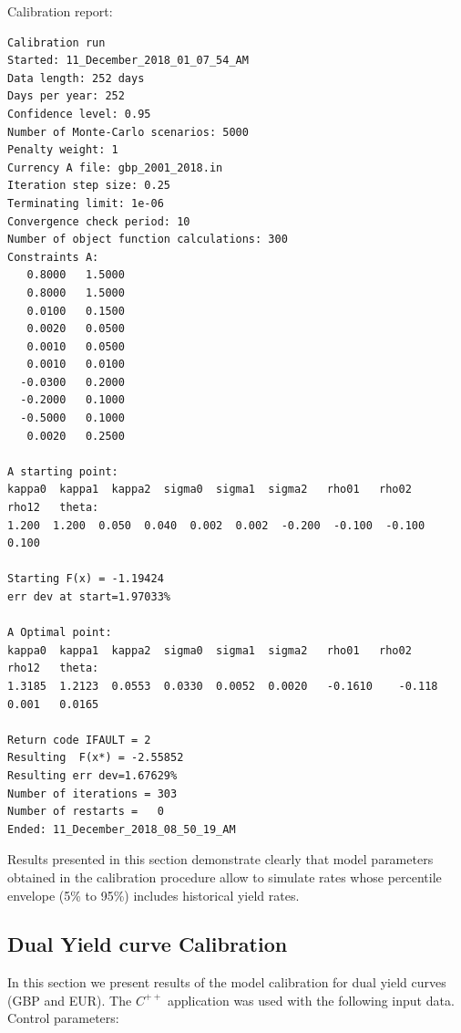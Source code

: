 \documentclass[10pt]{article}
\begin{document}
\begin{tcolorbox}

Calibration report:

\begin{verbatim}
Calibration run
Started: 11_December_2018_01_07_54_AM
Data length: 252 days
Days per year: 252
Confidence level: 0.95
Number of Monte-Carlo scenarios: 5000
Penalty weight: 1
Currency A file: gbp_2001_2018.in
Iteration step size: 0.25
Terminating limit: 1e-06
Convergence check period: 10
Number of object function calculations: 300
Constraints A:
   0.8000   1.5000
   0.8000   1.5000
   0.0100   0.1500
   0.0020   0.0500
   0.0010   0.0500
   0.0010   0.0100
  -0.0300   0.2000
  -0.2000   0.1000
  -0.5000   0.1000
   0.0020   0.2500

A starting point:
kappa0	kappa1	kappa2	sigma0	sigma1	sigma2   rho01	 rho02	  rho12	  theta:
1.200  1.200  0.050  0.040  0.002  0.002  -0.200  -0.100  -0.100  0.100

Starting F(x) = -1.19424
err dev at start=1.97033%

A Optimal point:
kappa0	kappa1	kappa2	sigma0	sigma1	sigma2   rho01	 rho02	  rho12	  theta:
1.3185	1.2123	0.0553	0.0330	0.0052	0.0020	 -0.1610	-0.118 	0.001 	0.0165

Return code IFAULT = 2
Resulting  F(x*) = -2.55852
Resulting err dev=1.67629%
Number of iterations = 303
Number of restarts =   0
Ended: 11_December_2018_08_50_19_AM
\end{verbatim}
\end{tcolorbox}

Results presented in this section demonstrate clearly that model parameters obtained in the calibration procedure allow to simulate rates whose percentile envelope (5\% to 95\%) includes historical yield rates.

\subsection{Dual Yield curve Calibration}

In this section we present results of the model calibration for dual yield curves (GBP and EUR). The $C^{++}$ application was used with the following input data. \\
Control parameters:
\end{document}

